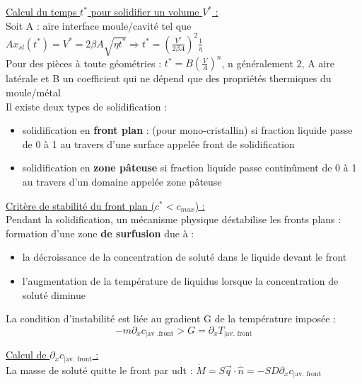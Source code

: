 \documentclass[../main.tex]{subfiles}
\begin{document}
\quad \underline{Calcul du temps $t^*$ pour solidifier un volume $V^*$ :}\\
Soit A : aire interface moule/cavité tel que $Ax_{sl}(t^*) = V^* = 2\beta A \sqrt{\eta t^*} \Rightarrow t^* = (\frac{V^*}{2\beta A})^2 \frac{1}{\eta}$\\

Pour des pièces à toute géométries : $t^* = B (\frac{V}{A})^n$, n généralement 2, A aire latérale et B un coefficient qui ne dépend que des propriétés thermiques du moule/métal\\

Il existe deux types de solidification : \begin{itemize}
    \item solidification en \textbf{front plan} : (pour mono-cristallin) si fraction liquide passe de 0 à 1 au travers d'une surface appelée front de solidification\\
    \item solidification en \textbf{zone pâteuse} si fraction liquide passe continûment de 0 à 1 au travers d'un domaine appelée zone pâteuse\\
\end{itemize}

\quad \underline{Critère de stabilité du front plan ($c^* < c_{max}$) :}\\

Pendant la solidification, un mécanisme physique déstabilise les fronts plans : formation d'une zone \textbf{de surfusion} due à : \begin{itemize}
    \item la décroissance de la concentration de soluté dans le liquide devant le front\\
    \item l'augmentation de la température de liquidus lorsque la concentration de soluté diminue\\
\end{itemize}

La condition d'instabilité est liée au gradient G de la température imposée :\begin{equation}
    -m\partial_x c_{\lvert \text{av .front}}>G = \partial_x T_{\lvert \text{av. front}}
\end{equation}

\quad \underline{Calcul de $\partial_x c_{\lvert \text{av. front}}$ :}\\
La masse de soluté quitte le front par udt : $\dot{M} = S \Vec{q}\cdot \hat{n} = -SD \partial_x c_{\lvert \text{av. front}}$\\
\end{document}

